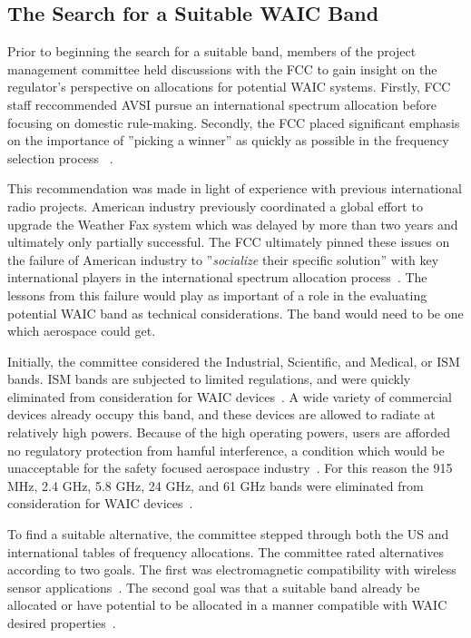 \subsection{The Search for a Suitable WAIC Band}
Prior to beginning the search for a suitable band, members of the project management committee held discussions with the FCC to gain insight on the regulator's perspective on allocations for potential WAIC systems. %
Firstly, FCC staff reccommended AVSI pursue an international spectrum allocation before focusing on domestic rule-making. Secondly, the FCC placed significant emphasis on the importance of  ''picking a winner'' as quickly as possible in the frequency selection process ~\cite{ferrell_feasibility_2007}. 

This recommendation was made in light of experience with previous international radio projects. American industry previously coordinated a global effort to upgrade the Weather Fax system which was delayed by more than two years and ultimately only partially successful. The FCC ultimately pinned these issues on the failure of American industry to ''\textit{socialize} their specific solution'' with key international players in the international spectrum allocation process~\cite{ferrell_feasibility_2007}. The lessons from this failure would play as important of a role in the evaluating potential WAIC band as technical considerations. The band would need to be one which aerospace could get.    
 
Initially, the committee considered the Industrial, Scientific, and Medical, or ISM bands. ISM bands are subjected to limited regulations, and were quickly eliminated from consideration for WAIC devices~\cite{ferrell_feasibility_2007}. A wide variety of commercial devices already occupy this band, and these devices are allowed to radiate at relatively high powers. Because of the high operating powers, users are afforded no regulatory protection from hamful interference, a condition which would be unacceptable for the safety focused aerospace industry~\cite{ferrell_feasibility_2007}. For this reason the 915 MHz, 2.4 GHz, 5.8 GHz, 24 GHz, and 61 GHz bands were eliminated from consideration for WAIC devices~\cite{ferrell_feasibility_2007}. 


To find a suitable alternative, the committee stepped through both the US and international tables of frequency allocations. The committee rated alternatives according to two goals. The first was electromagnetic compatibility with wireless sensor applications~\cite{ferrell_feasibility_2007}. The second goal was that a suitable band already be allocated or have potential to be allocated in a manner compatible with WAIC desired properties~\cite{ferrell_feasibility_2007}. 

